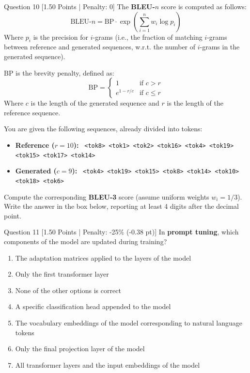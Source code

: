 \documentclass[11pt,a4paper]{article}
\begin{document}
\begin{questionbox}{Question 10 \hfill [1.50 Points | Penalty: 0]}
The \textbf{BLEU-$n$} score is computed as follows:
\begin{equation*}
    \text{BLEU-}n = \text{BP} \cdot \exp\left( \sum_{i=1}^n w_i \log p_i \right)
\end{equation*}
Where $p_i$ is the precision for $i$-grams (i.e., the fraction of matching $i$-grams between reference and generated sequences, w.r.t. the number of $i$-grams in the generated sequence).

\medskip
\noindent
$\text{BP}$ is the brevity penalty, defined as:
\begin{equation*}
    \text{BP} = \begin{cases} 
        1 & \text{if } c > r \\ 
        e^{1 - r/c} & \text{if } c \le r 
    \end{cases}
\end{equation*}
Where $c$ is the length of the generated sequence and $r$ is the length of the reference sequence.

\medskip
\noindent
You are given the following sequences, already divided into tokens:
\begin{itemize}[leftmargin=1.5em, itemsep=2pt]
    \item \textbf{Reference ($r=10$):} \texttt{ <tok8> <tok1> <tok2> <tok16> <tok4> <tok19> <tok15> <tok17> <tok14>}
    \item \textbf{Generated ($c=9$):} \texttt{ <tok4> <tok19> <tok15> <tok8> <tok14> <tok10> <tok18> <tok6>}
\end{itemize}

\medskip
\noindent
Compute the corresponding \textbf{BLEU-3} score (assume uniform weights $w_i = 1/3$). Write the answer in the box below, reporting at least 4 digits after the decimal point.
\end{questionbox}

\vspace{1.2em}

\begin{questionbox}{Question 11 \hfill [1.50 Points | Penalty: -25\% (-0.38 pt)]}
In \textbf{prompt tuning}, which components of the model are updated during training?

\begin{enumerate}[label=\alph*., leftmargin=2em]
    \item The adaptation matrices applied to the layers of the model
    \item Only the first transformer layer
    \item None of the other options is correct
    \item A specific classification head appended to the model
    \item The vocabulary embeddings of the model corresponding to natural language tokens
    \item Only the final projection layer of the model
    \item All transformer layers and the input embeddings of the model
\end{enumerate}
\end{questionbox}
\end{document}
